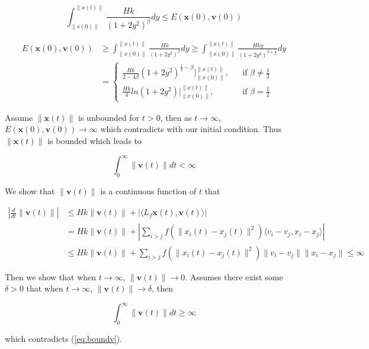 \begin{equation}
\int_{\|x(0)\|}^{\|x(t)\|}\frac{Hk}{(1+2y^2)^{\beta}}dy\leq E(\mathbf{x}(0), \mathbf{v}(0))
\end{equation}

\begin{equation}
\begin{aligned}
E(\mathbf{x}(0), \mathbf{v}(0))&\geq\int_{\|x(0)\|}^{\|x(t)\|}\frac{Hk}{(1+2y^2)^{\beta}}dy\geq\int_{\|x(0)\|}^{\|x(t)\|}\frac{Hky}{(1+2y^2)^{\beta+\frac{1}{2}}}dy\\
&=\left\{\begin{array}{rcl}\frac{Hk}{2-4\beta}(1+2y^2)^{\frac{1}{2}-\beta}|^{\|x(t)\|}_{\|x(0)\|}, & & \text{if $\beta\neq\frac{1}{2}$}\\\frac{Hk}{4}ln(1+2y^2)|^{\|x(t)\|}_{\|x(0)\|}, & & \text{if $\beta=\frac{1}{2}$}\end{array} \right.
\end{aligned}
\end{equation}

\noindent
Assume $\|\mathbf{x}(t)\|$ is unbounded for $t>0$, then as $t\to\infty$, $E(\mathbf{x}(0), \mathbf{v}(0))\to\infty$ which contradicts with our initial condition. Thus $\|\mathbf{x}(t)\|$ is bounded which leads to

\begin{equation}\label{eq:boundv}
\int_0^{\infty}\|\mathbf{v}(t)\|dt<\infty
\end{equation}

\noindent
We show that $\|\mathbf{v}(t)\|$ is a continuous function of $t$ that

\begin{equation}
\begin{aligned}
|\frac{d}{dt}\|\mathbf{v}(t)\||&\leq Hk\|\mathbf{v}(t)\|+|\langle L_f\mathbf{x}(t), \mathbf{v}(t)\rangle|\\
&=Hk\|\mathbf{v}(t)\|+|\sum_{i>j}f(\|x_i(t)-x_j(t)\|^2)\langle v_i-v_j, x_i-x_j\rangle|\\
&\leq Hk\|\mathbf{v}(t)\|+\sum_{i>j}f(\|x_i(t)-x_j(t)\|^2)\|v_i-v_j\| \|x_i-x_j\|\leq\infty
\end{aligned}
\end{equation}

\noindent
Then we show that when $t\to\infty$, $\|\mathbf{v}(t)\|\to0$. Assumes there exist some $\delta>0$ that when $t\to\infty$, $\|\mathbf{v}(t)\|\to\delta$, then

\begin{equation}
\int_0^{\infty}\|\mathbf{v}(t)\|dt\geq\infty
\end{equation}

\noindent
which contradicts (\ref{eq:boundv}).

\newpage
